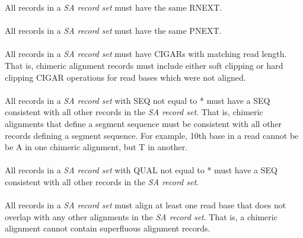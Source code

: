 \documentclass[10pt]{article}
\begin{document}
All records in a \textit{SA record set} must have the same RNEXT.

\paragraph{}

All records in a \textit{SA record set} must have the same PNEXT.

\paragraph{}

All records in a \textit{SA record set} must have CIGARs with matching read length. That is,
chimeric alignment records must include either soft clipping or hard clipping CIGAR operations
for read bases which were not aligned.

\paragraph{}

All records in a \textit{SA record set} with SEQ not equal to * must have a SEQ consistent
with all other records in the \textit{SA record set}. That is, chimeric alignments that define
a segment sequence must be consistent with all other records defining a segment sequence. For
example, 10th base in a read cannot be be A in one chimeric alignment, but T in another.

\paragraph{}

All records in a \textit{SA record set} with QUAL not equal to * must have a SEQ consistent
with all other records in the \textit{SA record set}.

\paragraph{}

All records in a \textit{SA record set} must align at least one read base that does not
overlap with any other alignments in the \textit{SA record set}.
That is, a chimeric alignment cannot contain superfluous alignment records.
\end{document}
